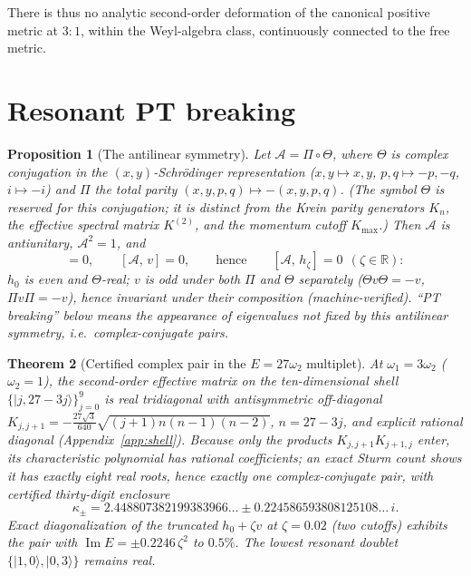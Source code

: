 \documentclass[11pt]{article}
\newtheorem{theorem}{Theorem}[section]
\newtheorem{proposition}[theorem]{Proposition}
\theoremstyle{definition}
\theoremstyle{remark}
\newcommand{\R}{\mathbb{R}}
\newcommand{\w}{\omega}
\begin{document}
There is thus no analytic second-order deformation of the canonical
positive metric at $3{:}1$, within the Weyl-algebra class, continuously
connected to the free metric.

\section{Resonant PT breaking}\label{sec:spectral}

\begin{proposition}[The antilinear symmetry]\label{prop:pt}
Let $\mathcal A=\Pi\circ\Theta$, where $\Theta$ is complex conjugation
in the $(x,y)$-Schr\"odinger representation ($x,y\mapsto x,y$,
$p,q\mapsto-p,-q$, $i\mapsto-i$) and $\Pi$ the total parity
$(x,y,p,q)\mapsto-(x,y,p,q)$.  (The symbol $\Theta$ is reserved for
this conjugation; it is distinct from the Krein parity generators
$K_n$, the effective spectral matrix $K^{(2)}$, and the momentum cutoff
$K_{\max}$.)  Then $\mathcal A$ is antiunitary, $\mathcal A^2=1$, and
\begin{equation}
[\mathcal A,\,h_0]=0,\qquad [\mathcal A,\,v]=0,
\qquad\text{hence}\qquad [\mathcal A,\,h_\zeta]=0
\ \ (\zeta\in\R):
\end{equation}
$h_0$ is even and $\Theta$-real; $v$ is odd under both $\Pi$ and
$\Theta$ separately ($\Theta v\Theta=-v$, $\Pi v\Pi=-v$), hence
invariant under their composition (machine-verified).  ``PT breaking''
below means the appearance of eigenvalues not fixed by this antilinear
symmetry, i.e.\ complex-conjugate pairs.
\end{proposition}

\begin{theorem}[Certified complex pair in the $E=27\w_2$ multiplet]
\label{thm:complexpair}
At $\w_1=3\w_2$ ($\w_2=1$), the second-order effective matrix on the
ten-dimensional shell $\{|j,27-3j\rangle\}_{j=0}^9$ is real tridiagonal
with antisymmetric off-diagonal
$K_{j,j+1}=-\tfrac{27\sqrt3}{640}\sqrt{(j{+}1)n(n{-}1)(n{-}2)}$,
$n=27-3j$, and explicit rational diagonal (Appendix~\ref{app:shell}).
Because only the products $K_{j,j+1}K_{j+1,j}$ enter, its
characteristic polynomial has \emph{rational} coefficients; an exact
Sturm count shows it has exactly eight real roots, hence exactly one
complex-conjugate pair, with certified thirty-digit enclosure
\begin{equation}
\kappa_\pm=2.448807382199383966\ldots\pm
0.224586593808125108\ldots\,i .
\end{equation}
Exact diagonalization of the truncated $h_0+\zeta v$ at $\zeta=0.02$
(two cutoffs) exhibits the pair with
$\operatorname{Im}E=\pm0.2246\,\zeta^2$ to $0.5\%$.  The lowest
resonant doublet $\{|1,0\rangle,|0,3\rangle\}$ remains real.
\end{theorem}
\end{document}
